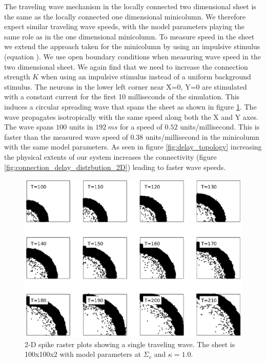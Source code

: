 The traveling wave mechanism in the locally connected two dimensional sheet is the same as the locally connected one dimensional minicolumn.
We therefore expect similar traveling wave speeds, with the model parameters playing the same role as in the one dimensional minicolumn.
To measure speed in the sheet we extend the approach taken for the minicolumn by using an impulsive stimulus (equation ).
We use open boundary conditions when measuring wave speed in the two dimensional sheet.
We again find that we need to increase the connection strength $K$ when using an impulsive stimulus instead of a uniform background stimulus.
The neurons in the lower left corner near X=0, Y=0 are stimulated with a constant current for the first 10 milliseconds of the simulation.
This induces a circular spreading wave that spans the sheet as shown in figure \ref{fig:2DWaveSpeedRaster}.
The wave propagates isotropically with the same speed along both the X and Y axes.
The wave spans $100$ units in $192~ms$ for a speed of $0.52$ units/millisecond.
This is faster than the measured wave speed of $0.38$ units/millisecond in the minicolumn with the same model parameters.
As seen in figure \ref{fig:delay_topology} increasing the physical extents of our system increases the 
connectivity (figure \ref{fig:connection_delay_distrbution_2D}) leading to faster wave speeds.
\begin{figure}[!htb]
 \caption{ 2-D spike raster plots showing a single traveling wave.
           The sheet is 100x100x2 with model parameters at $\Sigma_v$ and $\kappa=1.0$.
           }
 \label{fig:2DWaveSpeedRaster}
 \centering
   \includegraphics[width=\textwidth]{fig/2DWaveRasters_WaveSpeedExample}
\end{figure}
\FloatBarrier

